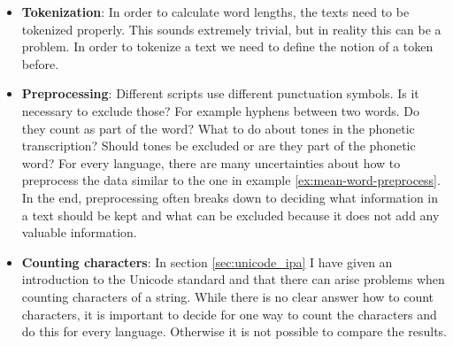 \begin{itemize}
    \item \textbf{Tokenization}: In order to calculate word lengths, the texts need to be tokenized properly. This sounds extremely trivial, but in reality this can be a problem. In order to tokenize a text we need to define the notion of a token before. 
    \item \textbf{Preprocessing}: Different scripts use different punctuation symbols. Is it necessary to exclude those? For example hyphens between two words. Do they count as part of the word? What to do about tones in the phonetic transcription? Should tones be excluded or are they part of the phonetic word? For every language, there are many uncertainties about how to preprocess the data similar to the one in example \ref{ex:mean-word-preprocess}. In the end, preprocessing often breaks down to deciding what information in a text should be kept and what can be excluded because it does not add any valuable information.
    
    
    \item \textbf{Counting characters}: In section \ref{sec:unicode_ipa} I have given an introduction to the Unicode standard and that there can arise problems when counting characters of a string. While there is no clear answer how to count characters, it is important to decide for one way to count the characters and do this for every language. Otherwise it is not possible to compare the results. 
\end{itemize}


